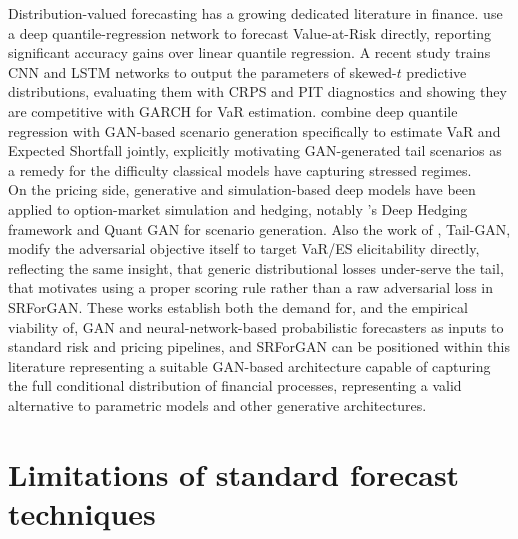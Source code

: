 Distribution-valued
forecasting has a growing dedicated literature in finance.
\cite{background:quantile_regression} use a deep quantile-regression
network to forecast Value-at-Risk directly, 
reporting significant accuracy gains over linear quantile regression. 
A recent study \cite{background:applications} 
trains CNN and LSTM networks to output the parameters 
of skewed-$t$ predictive distributions, 
evaluating them with CRPS and PIT diagnostics 
and showing they are competitive with GARCH for 
VaR estimation. 
\cite{background:applications2} combine deep quantile regression with GAN-based scenario generation specifically to estimate VaR and Expected Shortfall jointly, explicitly motivating GAN-generated tail scenarios as a remedy for the difficulty classical models have capturing stressed regimes.\\

On the pricing side, generative and simulation-based deep models have been applied to option-market 
simulation and hedging, 
notably \cite{background:applications3}'s Deep Hedging framework and 
 Quant GAN for scenario generation. 
Also the work of \cite{background:applications4}, Tail-GAN, modify the adversarial objective itself to 
target VaR/ES elicitability directly, 
reflecting the same insight, 
that generic distributional losses under-serve the tail, 
that motivates using a proper scoring rule rather than a raw adversarial loss in SRForGAN. 
These works establish both the demand for, and the 
empirical viability of, GAN and neural-network-based 
probabilistic forecasters as inputs to standard risk and 
pricing pipelines, and SRForGAN can be positioned within 
this literature representing a suitable GAN-based architecture
capable of capturing the full conditional distribution of financial processes,
representing a valid alternative to parametric models and other generative architectures.


\section{Limitations of standard forecast techniques}
\label{sec:literature_gap}

